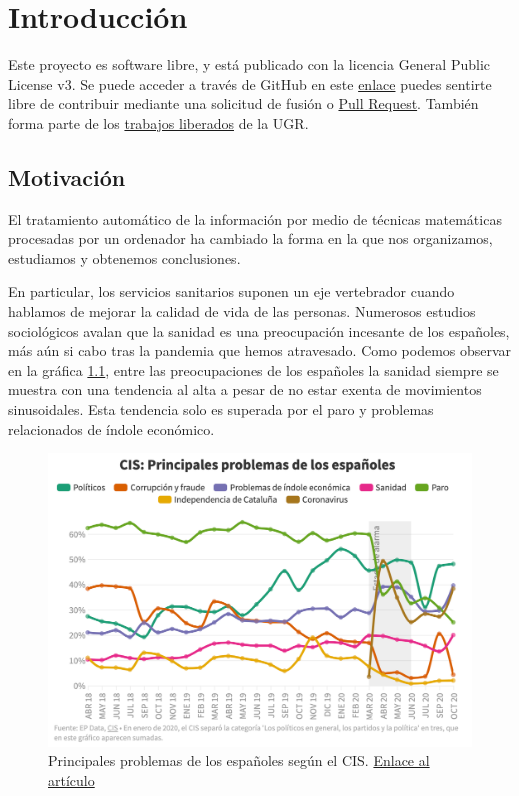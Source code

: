 \chapter{Introducción}
Este proyecto es software libre, y está publicado con la licencia \cite{gplv3} General
Public License v3. Se puede acceder a través de GitHub en este
\href{https://github.com/pablojjimenez/TFG}{enlace} puedes sentirte libre de contribuir
mediante una solicitud de fusión o \href{https://github.com/pablojjimenez/TFG/pulls}{Pull
Request}. También forma parte de los \href{https://github.com/JJ/TF-libres-UGR}{trabajos
liberados} de la UGR.

\section{Motivación} 
El tratamiento automático de la información por medio de técnicas matemáticas procesadas
por un ordenador ha cambiado la forma en la que nos organizamos, estudiamos y obtenemos
conclusiones.

En particular, los servicios sanitarios suponen un eje vertebrador cuando hablamos de
mejorar la calidad de vida de las personas. Numerosos estudios sociológicos avalan que la
sanidad es una preocupación incesante de los españoles, más aún si cabo tras la pandemia
que hemos atravesado. Como podemos observar en la gráfica \ref{fig:problemascis}, entre
las preocupaciones de los españoles la sanidad siempre se muestra con una tendencia al
alta a pesar de no estar exenta de movimientos sinusoidales. Esta tendencia solo es
superada por el paro y problemas relacionados de índole económico.

\FloatBarrier
\begin{figure}[]
	\centering	
	\includegraphics[scale=0.5]{doc/logos/imgs/CIS_1.png}
	\caption{ Principales problemas de los españoles según el CIS.
        \href{https://www.rtve.es/noticias/20201015/crisis-economica-coronavirus-preocupan-ahora-mas-espanoles-paro/2045610.shtml}{Enlace
        al artículo} }
    \label{fig:problemascis}
\end{figure}
\FloatBarrier

